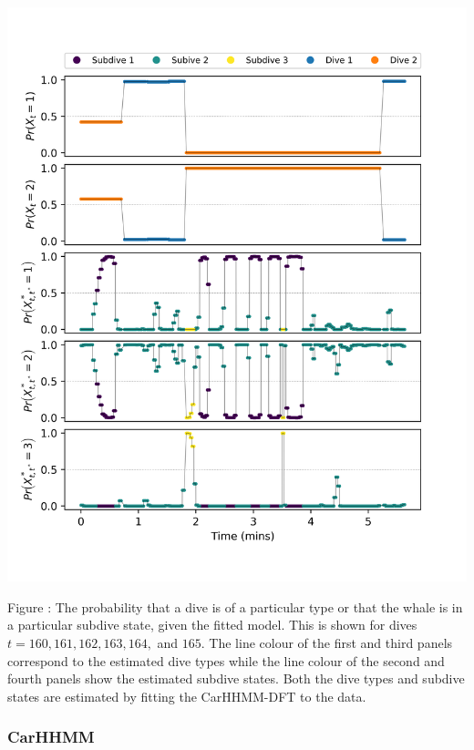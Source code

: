 \documentclass{article}
\begin{document}
        \begin{center}
        \includegraphics[width=6in]{../Plots/HHMM_decoded_states.png}
        \end{center}
        
        \noindent Figure : The probability that a dive is of a particular type or that the whale is in a particular subdive state, given the fitted model. This is shown for dives $t = 160,161,162,163,164,$ and $165$. The line colour of the first and third panels correspond to the estimated dive types while the line colour of the second and fourth panels show the estimated subdive states. Both the dive types and subdive states are estimated by fitting the CarHHMM-DFT to the data.
        \addtocounter{fignum}{1}
        
        \subsubsection{CarHHMM}
        
\end{document}
